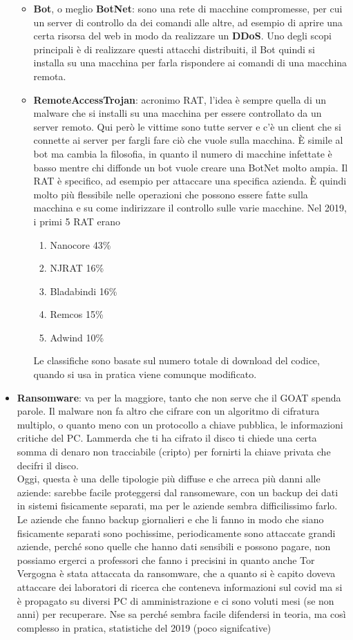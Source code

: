 \documentclass[12pt, oneside]{extbook}
\begin{document}
\begin{itemize}
\begin{itemize}
\item \textbf{Bot}, o meglio \textbf{BotNet}: sono una rete di macchine compromesse, per cui un server di controllo da dei comandi alle altre, ad esempio di aprire una certa risorsa del web in modo da realizzare un \textbf{DDoS}. Uno degli scopi principali è di realizzare questi attacchi distribuiti, il Bot quindi si installa su una macchina per farla rispondere ai comandi di una macchina remota.
\item \textbf{RemoteAccessTrojan}: acronimo RAT, l'idea è sempre quella di un malware che si installi su una macchina per essere controllato da un server remoto. Qui però le vittime sono tutte server e c'è un client che si connette ai server per fargli fare ciò che vuole sulla macchina. È simile al bot ma cambia la filosofia, in quanto il numero di macchine infettate è basso mentre chi diffonde un bot vuole creare una BotNet molto ampia. Il RAT è specifico, ad esempio per attaccare una specifica azienda. È quindi molto più flessibile nelle operazioni che possono essere fatte sulla macchina e su come indirizzare il controllo sulle varie macchine. Nel 2019, i primi 5 RAT erano
\begin{enumerate}
\item Nanocore 43\%
\item NJRAT 16\%
\item Bladabindi 16\%
\item Remcos 15\%
\item Adwind 10\%
\end{enumerate}
Le classifiche sono basate sul numero totale di download del codice, quando si usa in pratica viene comunque modificato.
\end{itemize}
\item \textbf{Ransomware}: va per la maggiore, tanto che non serve che il GOAT spenda parole. Il malware non fa altro che cifrare con un algoritmo di cifratura multiplo, o quanto meno con un protocollo a chiave pubblica, le informazioni critiche del PC. Lammerda che ti ha cifrato il disco ti chiede  una certa somma di denaro non tracciabile (cripto) per fornirti la chiave privata che decifri il disco.\\Oggi, questa è una delle tipologie più diffuse e che arreca più danni alle aziende: sarebbe facile proteggersi dal ransomeware, con un backup dei dati in sistemi fisicamente separati, ma per le aziende sembra difficilissimo farlo. Le aziende che fanno backup giornalieri e che li fanno in modo che siano fisicamente separati sono pochissime, periodicamente sono attaccate grandi aziende, perché sono quelle che hanno dati sensibili e possono pagare, non possiamo ergerci a professori che fanno i precisini in quanto anche Tor Vergogna è stata attaccata da ransomware, che a quanto si è capito doveva attaccare dei laboratori di ricerca che conteneva informazioni sul covid ma si è propagato su diversi PC di amministrazione e ci sono voluti mesi (se non anni) per recuperare. Nse sa perché sembra facile difendersi in teoria, ma così complesso in pratica, statistiche del 2019 (poco signifcative)

\end{itemize}
\end{document}
